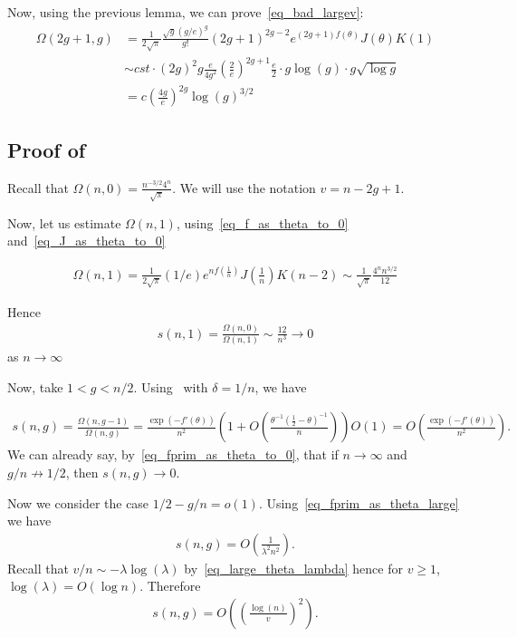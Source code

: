 \documentclass[a4paper,12pt]{article}
\theoremstyle{definition}
\newcommand{\bigO}[1]{O\left({#1}\right)}
\newcommand{\halfminth}{\left(\frac 1 2 -\theta\right)}
\newcommand{\bigpar}[1]{\left({#1}\right)}
\begin{document}
Now, using the previous lemma, we can prove~\eqref{eq_bad_largev}:
\begin{align*}
    \Omega(2g+1,g)&=\frac{1}{2\sqrt{\pi}} \frac{\sqrt{g}(g/e)^g}{g!}(2g+1)^{2g-2}e^{(2g+1)f(\theta)}{J}\left(\theta\right)K(1)\\
    &\sim cst\cdot (2g)^2g\frac{e}{4g^2}\left(\frac{2}{e}\right)^{2g+1}\frac{e}{2}\cdot g\log(g)\cdot g\sqrt{\log g}\\
    &=c\left(\frac{4g}{e}\right)^{2g}\log(g)^{3/2}
\end{align*}



\subsection{Proof of }\label{sec:s_largev}


Recall that $\Omega(n,0)=\frac{n^{-3/2}4^n}{\sqrt{\pi}}$. We will use the notation $v=n-2g+1$.

Now, let us estimate $\Omega(n,1)$, using~\eqref{eq_f_as_theta_to_0} and~\eqref{eq_J_as_theta_to_0}

\begin{align*}
    \Omega(n,1)=\frac{1}{2\sqrt{\pi}} (1/e)e^{nf(\frac{1}{n})}{J}\left(\frac{1}{n}\right)K(n-2)\sim \frac{1}{\sqrt{\pi}} \frac{4^nn^{3/2}}{12}
\end{align*}

Hence
\begin{align*}
    s(n,1)=\frac{\Omega(n,0)}{\Omega(n,1)}\sim \frac{12}{n^3}\to 0
\end{align*}
as $n\to \infty$



Now, take $1<g<n/2$. Using~ with $\delta=1/n$, we have

\begin{align*}
    s(n,g)=\frac{\Omega(n,g-1)}{\Omega(n,g)}=\frac{\exp(-f'(\theta))}{n^2}\bigpar{1+\bigO{\frac{\theta^{-1}\halfminth^{-1}}{n}}}\bigO{1}=\bigO{\frac{\exp(-f'(\theta))}{n^2}}.
\end{align*}
We can already say, by~\eqref{eq_fprim_as_theta_to_0}, that if $n\to \infty$ and $g/n\not\to 1/2$, then $s(n,g)\to 0$.

Now we consider the case  $1/2-g/n=o(1)$. Using~\eqref{eq_fprim_as_theta_large} we have
\begin{align*}
    s(n,g)=\bigO{\frac{1}{\lambda^2n^2}}.
\end{align*}
Recall that $v/n\sim -\lambda\log(\lambda)$ by~\eqref{eq_large_theta_lambda} hence for $v\geq 1$, $\log(\lambda)=\bigO{\log n}$. Therefore
\begin{align}\label{ghj}
    s(n,g)=\bigO{\bigpar{\frac{\log(n)}{v}}^2}.
\end{align}
\end{document}
